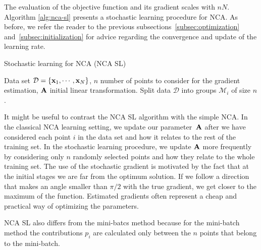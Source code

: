 The evaluation of the objective function and its gradient scales with $nN$. Algorithm \ref{alg:nca-sl} presents a stochastic learning procedure for NCA. As before, we refer the reader to the previous subsections~\ref{subsec:optimization} and~\ref{subsec:initialization} for advice regarding the convergence and update of the learning rate.

	\begin{algorithm} 
		\caption{Stochastic learning for NCA (NCA SL)} 
		\label{alg:nca-sl}  
		\begin{algorithmic}[1]                    
			\REQUIRE Data set $\mathcal{D}=\{\mathbf{x}_1,\cdots,\mathbf{x}_N\}$, $n$ number of points
to consider for the gradient estimation, $\mathbf{A}$ initial linear transformation.
			\REPEAT
				\STATE Split data $\mathcal{D}$ into groups $\mathcal{M}_i$ of size $n$.\
				\ENDFOR
		\end{algorithmic}
	\end{algorithm}

It might be useful to contrast the NCA SL algorithm with the simple NCA. In the classical NCA learning setting, we update our parameter~$\mathbf{A}$
after we have considered each point $i$ in the data set and how it relates to the rest of the training set. In the stochastic
learning procedure, we update $\mathbf{A}$ more frequently by considering only $n$
randomly selected points and how they relate to the whole training set. 
The use of the stochastic gradient is motivated by the fact that at the initial stages we are far from the optimum solution. If we follow a direction that makes an angle smaller than $\pi/2$ with the true gradient, we get closer to the maximum of the function. Estimated gradients often represent a cheap and practical way of optimizing the parameters.

NCA SL also differs from the mini-batcs method because for the mini-batch method the contributions $p_i$ are calculated only between the $n$ points that belong to the mini-batch.

